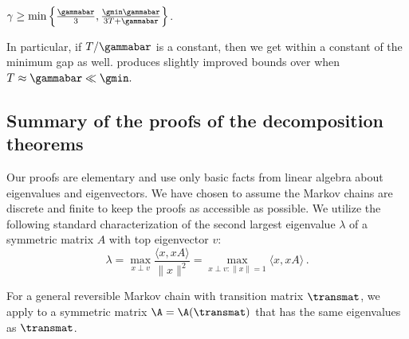 \documentclass{toc}
\begin{document}
\begin{corollary}\label{cor:compareT}
 $\gamma\geq \min\left\{\frac{\gammabar}{3}, \frac{\gmin\gammabar}{3T+\gammabar}\right\}$.
\end{corollary}

\noindent In particular, if $T/\gammabar$ is a constant, then
we get within a constant of the minimum gap as well.   produces
slightly improved bounds over  when
$T\approx \gammabar\ll \gmin.$  

\subsection{Summary of the proofs of the decomposition theorems}\label{sec:summary}
  
Our proofs are elementary and use only basic facts from linear algebra 
about eigenvalues and eigenvectors.  We have chosen to assume the 
Markov chains are discrete and finite to keep the proofs as accessible 
as possible. We utilize the following standard characterization of the 
second largest eigenvalue $\lambda$ of a symmetric matrix $A$ with top 
eigenvector $v$:
\begin{equation}\label{eq:eigen} 
\lambda = \max_{x\perp v}\frac{\langle x,xA\rangle}{\|x\|^2}
           = \max_{x\perp v:\|x\|=1}\langle x,xA\rangle\,.  
\end{equation} 

\noindent For a general reversible Markov chain with transition matrix 
$\transmat$, we apply  to a symmetric matrix 
$\A=\A(\transmat)$ that has the same eigenvalues as $\transmat$. 
\end{document}
